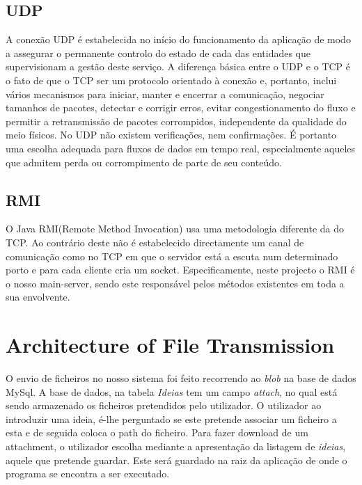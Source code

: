 \documentclass[12pt]{article} %
\begin{document}
\subsection{UDP}
A conexão UDP é estabelecida no início do funcionamento da aplicação de modo a assegurar o permanente controlo do estado de cada das entidades que supervisionam a gestão deste serviço. A diferença básica entre o UDP e o TCP é o fato de que o TCP ser um protocolo orientado à conexão e, portanto, inclui vários mecanismos para iniciar, manter e encerrar a comunicação, negociar tamanhos de pacotes, detectar e corrigir erros, evitar congestionamento do fluxo e permitir a retransmissão de pacotes corrompidos, independente da qualidade do meio físicos. No UDP não existem verificações, nem confirmações. 
É portanto uma escolha adequada para fluxos de dados em tempo real, especialmente aqueles que admitem perda ou corrompimento de parte de seu conteúdo.


\subsection{RMI}
O Java RMI(Remote Method Invocation) usa uma metodologia diferente da do TCP. Ao contrário deste não é estabelecido directamente um canal de comunicação como no TCP em que o servidor está a escuta num determinado porto e para cada cliente cria um socket.
Especificamente, neste projecto o RMI é o nosso main-server, sendo este responsável pelos métodos existentes em toda a sua envolvente.



\section{Architecture of File Transmission}
\label{sec:archi}
O envio de ficheiros no nosso sistema foi feito recorrendo ao \emph{blob} na base de dados MySql. A base de dados, na tabela \emph{Ideias} tem um campo \emph{attach}, no qual está sendo armazenado os ficheiros pretendidos pelo utilizador. O utilizador ao introduzir uma ideia, é-lhe perguntado se este pretende associar um ficheiro a esta e de seguida coloca o path do ficheiro. Para fazer download de um attachment, o utilizador escolha mediante a apresentação da listagem de \emph{ideias}, aquele que pretende guardar. Este será guardado na raiz da aplicação de onde o programa se encontra a ser executado.
\end{document}
